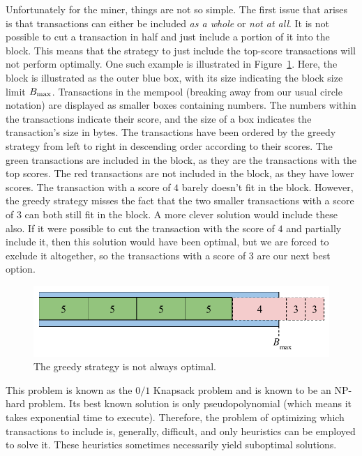 Unfortunately for the miner, things are not so simple. The first issue that arises is that
transactions can either be included \emph{as a whole} or \emph{not at all}. It is not possible
to cut a transaction in half and just include a portion of it into the block. This means that
the strategy to just include the top-score transactions will not perform optimally. One
such example is illustrated in Figure~\ref{fig.rational-miner-txs}. Here, the block is
illustrated as the outer blue box, with its size indicating the block size limit $B_\mathrm{max}$.
Transactions in the mempool (breaking away from our usual circle
notation) are displayed as smaller boxes containing numbers. The numbers within the transactions
indicate their score, and the size of a box indicates the transaction's size in bytes.
The transactions have been ordered by the greedy strategy from left to right in
descending order according to their scores. The green transactions are included in
the block, as they are the transactions with the top scores. The red transactions
are not included in the block, as they have lower scores. The transaction with
a score of $4$ barely doesn't fit in the block. However, the greedy strategy misses
the fact that the two smaller transactions with a score of $3$ can both still fit in
the block. A more clever solution would include these also. If it were possible to cut the
transaction with the score of $4$ and partially include it, then this solution would
have been optimal, but we are forced to exclude it altogether, so the transactions
with a score of $3$ are our next best option.

\begin{figure}[h]
  \centering
  \includegraphics[width=0.8 \columnwidth,keepaspectratio]{figures/rational-miner-txs.pdf}
  \caption{The greedy strategy is not always optimal.}
  \label{fig.rational-miner-txs}
\end{figure}

This problem is known as the $0/1$ Knapsack problem and is known to be an NP-hard problem.
Its best known solution is only pseudopolynomial (which means it takes exponential time to
execute). Therefore, the problem of optimizing
which transactions to include is, generally, difficult, and only heuristics can be employed
to solve it. These heuristics sometimes necessarily yield suboptimal solutions.

